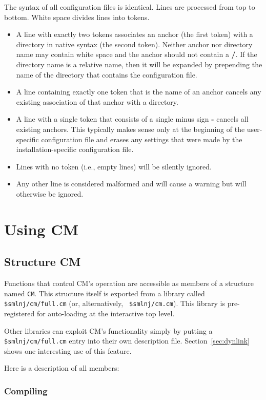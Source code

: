 \documentclass[titlepage,letterpaper]{article}
\begin{document}
The syntax of all configuration files is identical.  Lines are
processed from top to bottom. White space divides lines into tokens.
\begin{itemize}
\item A line with exactly two tokens associates an anchor (the first
token) with a directory in native syntax (the second token).  Neither
anchor nor directory name may contain white space and the anchor
should not contain a {\bf /}.  If the directory name is a relative
name, then it will be expanded by prepending the name of the directory
that contains the configuration file.
\item A line containing exactly one token that is the name of an
anchor cancels any existing association of that anchor with a
directory.
\item A line with a single token that consists of a single minus sign
{\bf -} cancels all existing anchors.  This typically makes sense only
at the beginning of the user-specific configuration file and
erases any settings that were made by the installation-specific
configuration file.
\item Lines with no token (i.e., empty lines) will be silently ignored.
\item Any other line is considered malformed and will cause a warning
but will otherwise be ignored.
\end{itemize}

\section{Using CM}

\subsection{Structure CM}
\label{sec:api}

Functions that control CM's operation are accessible as members of a
structure named {\tt CM}.  This structure itself is exported from a
library called {\tt \$smlnj/cm/full.cm} (or, alternatively, {\tt
\$smlnj/cm.cm}).  This library is pre-registered for auto-loading at
the interactive top level.

Other libraries can exploit CM's functionality simply by putting a
{\tt \$smlnj/cm/full.cm} entry into their own description file.
Section~\ref{sec:dynlink} shows one interesting use of this feature.

Here is a description of all members:

\subsubsection*{Compiling}
\end{document}
